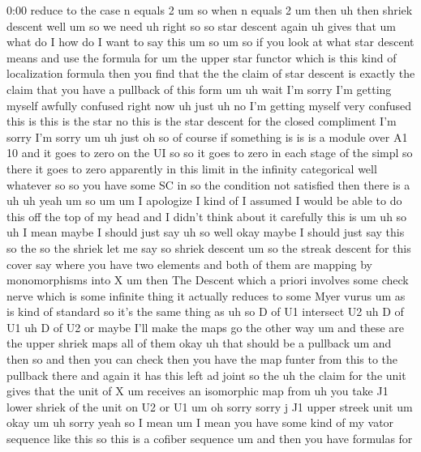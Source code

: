 \begin{unfinished}{0:00}
reduce  to  the  case  n  equals  2  um  so  when
n  equals  2  um  then  uh  then  shriek
descent  well  um  so  we  need  uh  right  so
so  star
descent  again  uh  gives  that
um  what  do  I  how  do  I  want  to  say  this
um
so
um  so  if  you  look  at  what  star  descent
means  and  use  the  formula  for  um  the
upper  star  functor  which  is  this  kind  of
localization  formula  then  you  find  that
the  the  claim  of  star  descent  is  exactly
the  claim  that  you  have  a  pullback  of
this
form
um
uh  wait  I'm  sorry  I'm  getting  myself
awfully  confused  right  now
uh  just  uh
no  I'm  getting  myself  very  confused  this
is  this  is  the  star  no  this  is  the  star
descent  for  the  closed  compliment  I'm
sorry  I'm  sorry
um  uh  just
oh
so  of  course  if  something  is  is  is  a
module  over  A1  10  and  it  goes  to  zero  on
the
UI  so  so  it  goes  to  zero  in  each  stage
of  the
simpl  so  there  it  goes  to
zero  apparently  in  this  limit  in  the
infinity  categorical  well  whatever  so  so
you  have  some  SC  in  so  the  condition  not
satisfied  then  there  is
a
uh  uh
yeah  um  so
um  um  I  apologize  I  kind  of  I  assumed  I
would  be  able  to  do  this  off  the  top  of
my  head  and  I  didn't  think  about  it
carefully  this  is
um
uh
so  uh  I  mean  maybe  I  should  just  say  uh
so  well  okay  maybe  I  should  just  say
this  so
the  so  the  shriek  let  me  say  so  shriek
descent  um  so  the  streak  descent  for
this  cover  say  where  you  have  two
elements  and  both  of  them  are  mapping  by
monomorphisms  into  X  um  then  The
Descent  which  a  priori  involves  some
check  nerve  which  is  some  infinite  thing
it  actually  reduces  to  some  Myer  vurus
um  as  is  kind  of  standard  so  it's  the
same  thing  as  uh  so  D  of  U1  intersect  U2
uh  D  of  U1  uh  D  of  U2  or  maybe  I'll  make
the  maps  go  the  other  way
um
and  these  are  the  upper  shriek  maps  all
of
them  okay  uh  that  should  be  a  pullback
um  and  then  so  and  then  you  can  check
then  you  have  the  map  funter  from  this
to  the  pullback  there  and  again  it  has
this  left  ad  joint  so  the  uh  the  claim
for  the  unit  gives  that  the  unit  of  X  um
receives  an  isomorphic  map  from  uh  you
take
J1  lower  shriek  of  the  unit  on  U2  or
U1
um  oh  sorry  sorry  j  J1  upper
streek
unit
um  okay  um  uh  sorry  yeah  so  I  mean  um  I
mean  you  have  some  kind  of  my  vator
sequence  like  this  so  this  is  a  cofiber
sequence
um  and  then  you  have  formulas  for

\end{unfinished}
